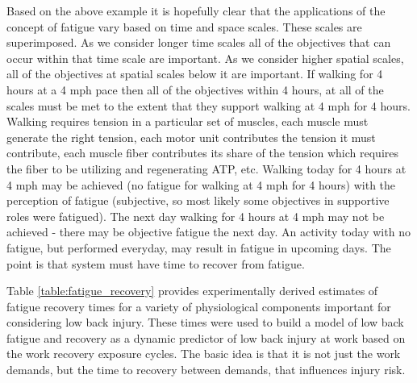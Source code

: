 Based on the above example it is hopefully clear that the applications of the concept of fatigue vary based on time and space scales. These scales are superimposed. As we consider longer time scales all of the objectives that can occur within that time scale are important. As we consider higher spatial scales, all of the objectives at spatial scales below it are important. If walking for 4 hours at a 4 mph pace then all of the objectives within 4 hours, at all of the scales must be met to the extent that they support walking at 4 mph for 4 hours. Walking requires tension in a particular set of muscles, each muscle must generate the right tension, each motor unit contributes the tension it must contribute, each muscle fiber contributes its share of the tension which requires the fiber to be utilizing and regenerating ATP, etc. Walking today for 4 hours at 4 mph may be achieved (no fatigue for walking at 4 mph for 4 hours) with the perception of fatigue (subjective, so most likely some objectives in supportive roles were fatigued). The next day walking for 4 hours at 4 mph may not be achieved - there may be objective fatigue the next day. An activity today with no fatigue, but performed everyday, may result in fatigue in upcoming days. The point is that system must have time to recover from fatigue. 

Table \ref{table:fatigue_recovery} provides experimentally derived estimates of fatigue recovery times for a variety of physiological components important for considering low back injury. These times were used to build a model of low back fatigue and recovery as a dynamic predictor of low back injury at work based on the work recovery exposure cycles. The basic idea is that it is not just the work demands, but the time to recovery between demands, that influences injury risk.

